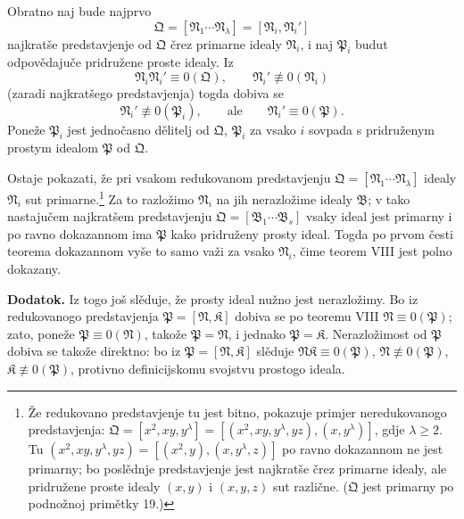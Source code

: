\documentclass[11pt]{article}
\newcommand{\ideal}[1]{\mathfrak{#1}}
\begin{document}
Obratno naj bude najprvo
\[
 \ideal Q=[\ideal N_1\cdots\ideal N_\lambda]=[\ideal N_i,\ideal N_i']
\]
najkratše predstavjenje od \(\ideal Q\) črez primarne idealy \(\ideal N_i\), i naj \(\ideal P_i\) budut odpovědajuče pridružene proste idealy. Iz
\[
 \ideal N_i\ideal N_i'\equiv0(\ideal Q),\qquad
 \ideal N_i'\not\equiv0(\ideal N_i)
\]
(zaradi najkratšego predstavjenja) togda dobiva se
\[
 \ideal N_i'\not\equiv0(\ideal P_i),\qquad
 \text{ale}\qquad
 \ideal N_i'\equiv0(\ideal P).
\]
Poneže \(\ideal P_i\) jest jednočasno dělitelj od \(\ideal Q\), \(\ideal P_i\) za vsako \(i\) sovpada s pridruženym prostym idealom \(\ideal P\) od \(\ideal Q\).

Ostaje pokazati, že pri vsakom redukovanom predstavjenju \(\ideal Q=[\ideal N_1\cdots\ideal N_\lambda]\) idealy \(\ideal N_i\) sut primarne.\footnote{Že redukovano predstavjenje tu jest bitno, pokazuje primjer neredukovanogo predstavjenja: \(\ideal Q=[x^2,xy,y^\lambda]=[(x^2,xy,y^\lambda,yz),(x,y^\lambda)]\), gdje \(\lambda\ge2\). Tu \((x^2,xy,y^\lambda,yz)=[(x^2,y),(x,y^\lambda,z)]\) po ravno dokazannom ne jest primarny; bo poslědnje predstavjenje jest najkratše črez primarne idealy, ale pridružene proste idealy \((x,y)\) i \((x,y,z)\) sut različne. (\(\ideal Q\) jest primarny po podnožnoj primětky 19.)} Za to razložimo \(\ideal N_i\) na jih nerazložime idealy \(\ideal B\); v tako nastajučem najkratšem predstavjenju \(\ideal Q=[\ideal B_1\cdots\ideal B_s]\) vsaky ideal jest primarny i po ravno dokazannom ima \(\ideal P\) kako pridruženy prosty ideal. Togda po prvom česti teorema dokazannom vyše to samo važi za vsako \(\ideal N_i\), čime teorem VIII jest polno dokazany.

\textbf{Dodatok.} Iz togo još slěduje, že prosty ideal nužno jest nerazložimy. Bo iz redukovanogo predstavjenja \(\ideal P=[\ideal N,\ideal K]\) dobiva se po teoremu VIII \(\ideal N\equiv0(\ideal P)\); zato, poneže \(\ideal P\equiv0(\ideal N)\), takože \(\ideal P=\ideal N\), i jednako \(\ideal P=\ideal K\). Nerazložimost od \(\ideal P\) dobiva se takože direktno: bo iz \(\ideal P=[\ideal N,\ideal K]\) slěduje \(\ideal N\ideal K\equiv0(\ideal P)\), \(\ideal N\not\equiv0(\ideal P)\), \(\ideal K\not\equiv0(\ideal P)\), protivno definicijskomu svojstvu prostogo ideala.
\end{document}

